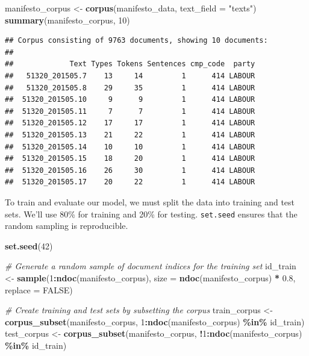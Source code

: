 \documentclass[
]{book}
\newenvironment{Shaded}{\begin{snugshade}}{\end{snugshade}}
\newcommand{\AttributeTok}[1]{\textcolor[rgb]{0.13,0.29,0.53}{#1}}
\newcommand{\CommentTok}[1]{\textcolor[rgb]{0.56,0.35,0.01}{\textit{#1}}}
\newcommand{\ConstantTok}[1]{\textcolor[rgb]{0.56,0.35,0.01}{#1}}
\newcommand{\DecValTok}[1]{\textcolor[rgb]{0.00,0.00,0.81}{#1}}
\newcommand{\FloatTok}[1]{\textcolor[rgb]{0.00,0.00,0.81}{#1}}
\newcommand{\FunctionTok}[1]{\textcolor[rgb]{0.13,0.29,0.53}{\textbf{#1}}}
\newcommand{\NormalTok}[1]{#1}
\newcommand{\OtherTok}[1]{\textcolor[rgb]{0.56,0.35,0.01}{#1}}
\newcommand{\SpecialCharTok}[1]{\textcolor[rgb]{0.81,0.36,0.00}{\textbf{#1}}}
\newcommand{\StringTok}[1]{\textcolor[rgb]{0.31,0.60,0.02}{#1}}
\begin{document}
\begin{Shaded}
\begin{Highlighting}[]
\NormalTok{manifesto\_corpus }\OtherTok{\textless{}{-}} \FunctionTok{corpus}\NormalTok{(manifesto\_data, }\AttributeTok{text\_field =} \StringTok{"texts"}\NormalTok{)}
\FunctionTok{summary}\NormalTok{(manifesto\_corpus, }\DecValTok{10}\NormalTok{)}
\end{Highlighting}
\end{Shaded}

\begin{verbatim}
## Corpus consisting of 9763 documents, showing 10 documents:
## 
##             Text Types Tokens Sentences cmp_code  party
##   51320_201505.7    13     14         1      414 LABOUR
##   51320_201505.8    29     35         1      414 LABOUR
##  51320_201505.10     9      9         1      414 LABOUR
##  51320_201505.11     7      7         1      414 LABOUR
##  51320_201505.12    17     17         1      414 LABOUR
##  51320_201505.13    21     22         1      414 LABOUR
##  51320_201505.14    10     10         1      414 LABOUR
##  51320_201505.15    18     20         1      414 LABOUR
##  51320_201505.16    26     30         1      414 LABOUR
##  51320_201505.17    20     22         1      414 LABOUR
\end{verbatim}

To train and evaluate our model, we must split the data into training and test sets. We'll use 80\% for training and 20\% for testing. \texttt{set.seed} ensures that the random sampling is reproducible.

\begin{Shaded}
\begin{Highlighting}[]
\FunctionTok{set.seed}\NormalTok{(}\DecValTok{42}\NormalTok{)}

\CommentTok{\# Generate a random sample of document indices for the training set}
\NormalTok{id\_train }\OtherTok{\textless{}{-}} \FunctionTok{sample}\NormalTok{(}\DecValTok{1}\SpecialCharTok{:}\FunctionTok{ndoc}\NormalTok{(manifesto\_corpus), }\AttributeTok{size =} \FunctionTok{ndoc}\NormalTok{(manifesto\_corpus) }\SpecialCharTok{*} \FloatTok{0.8}\NormalTok{,}
    \AttributeTok{replace =} \ConstantTok{FALSE}\NormalTok{)}

\CommentTok{\# Create training and test sets by subsetting the corpus}
\NormalTok{train\_corpus }\OtherTok{\textless{}{-}} \FunctionTok{corpus\_subset}\NormalTok{(manifesto\_corpus, }\DecValTok{1}\SpecialCharTok{:}\FunctionTok{ndoc}\NormalTok{(manifesto\_corpus) }\SpecialCharTok{\%in\%}\NormalTok{ id\_train)}
\NormalTok{test\_corpus }\OtherTok{\textless{}{-}} \FunctionTok{corpus\_subset}\NormalTok{(manifesto\_corpus, }\SpecialCharTok{!}\DecValTok{1}\SpecialCharTok{:}\FunctionTok{ndoc}\NormalTok{(manifesto\_corpus) }\SpecialCharTok{\%in\%}\NormalTok{ id\_train)}
\end{Highlighting}
\end{Shaded}
\end{document}
